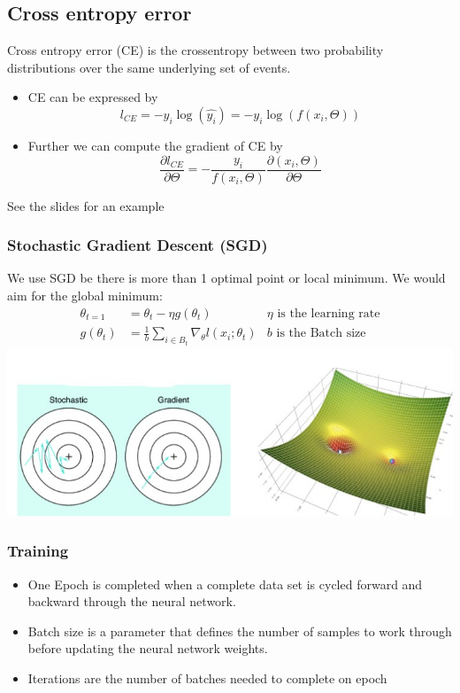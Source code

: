 \documentclass[letterpaper,12pt]{article}
\begin{document}
\subsection{Cross entropy error}
Cross entropy error (CE) is the cross\-entropy between two probability distributions over the same underlying set of events. \begin{itemize}
    \item CE can be expressed by \[l_{CE}=-y_i\log(\hat{y_i})=-y_i\log(f(x_i,\Theta))\]
    \item Further we can compute the gradient of CE by\[\frac{\partial l_{CE}}{\partial \Theta}=-\frac{y_i}{f(x_i,\Theta)}\frac{\partial (x_i,\Theta)}{\partial\Theta}\]
\end{itemize}
See the slides for an example
\subsubsection{Stochastic Gradient Descent (SGD)}

We use SGD be there is more than 1 optimal point or local minimum. We would aim for the global minimum:
\begin{align*}
    \theta_{t=1}&=\theta_t-\eta g(\theta_t)&\eta\text{ is the learning rate}\\
    g(\theta_t)&=\frac{1}{b}\sum_{i\in B_t}\nabla_\theta l(x_i;\theta_t)& b\text{ is the Batch size}
\end{align*}
\includegraphics*{./Image/SGD.jpg}
\subsubsection{Training}
\begin{itemize}
    \item One Epoch is completed when a complete data set is cycled forward and backward through the neural network.
    \item Batch size is a parameter that defines the number of samples to work through before updating the neural network weights.
    \item Iterations are the number of batches needed to complete on epoch
\end{itemize}
\end{document}
